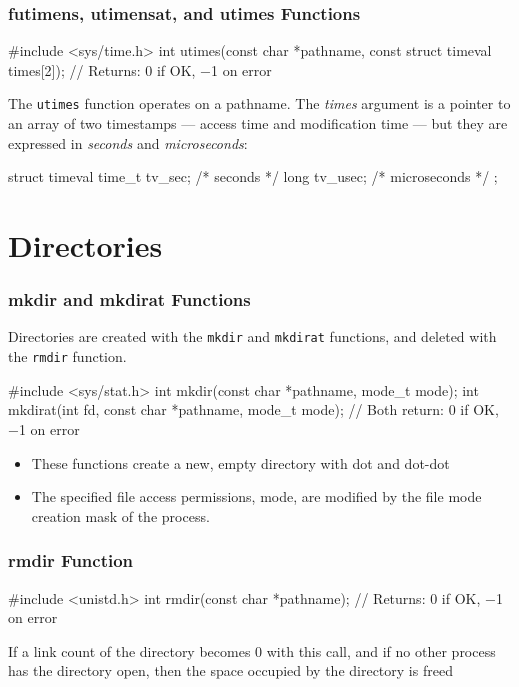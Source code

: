 \documentclass[newPxFont,sthlmFooter,nooffset]{beamer}
\begin{document}
\begin{frame}[containsverbatim,t]
    \frametitle{futimens, utimensat, and utimes Functions}

\begin{codedef}
#include <sys/time.h>
int utimes(const char *pathname, const struct timeval times[2]);
// Returns: 0 if OK, −1 on error
\end{codedef}

The \texttt{utimes} function operates on a pathname. The \textit{times} argument is a pointer to an array of two timestamps — access time and modification time — but they are expressed in \textit{seconds} and \textit{microseconds}:

\begin{codedef}
struct timeval {
       time_t tv_sec;    /* seconds */
       long   tv_usec;   /* microseconds */
};
\end{codedef}

\end{frame}



\section{Directories}

\begin{frame}[containsverbatim,t]
  \frametitle{mkdir and mkdirat Functions}
Directories are created with the \texttt{mkdir} and \texttt{mkdirat}
functions, and deleted with the \texttt{rmdir} function.

\begin{codedef}
#include <sys/stat.h>
int mkdir(const char *pathname, mode_t mode);
int mkdirat(int fd, const char *pathname, mode_t mode);
// Both return: 0 if OK, −1 on error    
\end{codedef}

\begin{itemize}
\item These functions create a new, empty directory with dot and dot-dot
\item The specified file access permissions, mode, are modified by the file mode creation mask of the process.
\end{itemize}

\end{frame}


\begin{frame}[containsverbatim,t]
  \frametitle{rmdir Function}
\begin{codedef}
#include <unistd.h>
int rmdir(const char *pathname);
// Returns: 0 if OK, −1 on error
\end{codedef}
\bigskip

If a link count of the directory becomes 0 with this call, and if no other process has the directory open, then the space occupied by the directory is freed

\end{frame}
\end{document}
